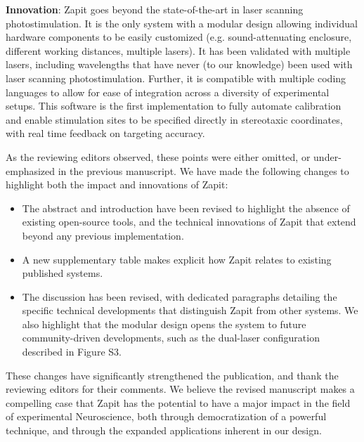 \documentclass[12pt]{letter}
\begin{document}
\textbf{Innovation}: Zapit goes beyond the state-of-the-art in laser scanning photostimulation. It is the only system with a modular design allowing individual hardware components to be easily customized (e.g. sound-attenuating enclosure, different working distances, multiple lasers). It has been validated with multiple lasers, including wavelengths that have never (to our knowledge) been used with laser scanning photostimulation. Further, it is compatible with multiple coding languages to allow for ease of integration across a diversity of experimental setups. This software is the first implementation to fully automate calibration and enable stimulation sites to be specified directly in stereotaxic coordinates, with real time feedback on targeting accuracy. 

As the reviewing editors observed, these points were either omitted, or under-emphasized in the previous manuscript. We have made the following changes to highlight both the impact and innovations of Zapit:

\begin{itemize}
    \item The abstract and introduction have been revised to highlight the absence of existing open-source tools, and the technical innovations of Zapit that extend beyond any previous implementation.
    \item     A new supplementary table makes explicit how Zapit relates to existing published systems.
    \item The discussion has been revised, with dedicated paragraphs detailing the specific technical developments that distinguish Zapit from other systems. We also highlight that the modular design opens the system to future community-driven developments, such as the dual-laser configuration described in Figure S3. 
\end{itemize}

These changes have significantly strengthened the publication, and thank the reviewing editors for their comments. We believe the revised manuscript makes a compelling case that Zapit has the potential to have a major impact in the field of experimental Neuroscience, both through democratization of a powerful technique, and through the expanded applications inherent in our design. 
\end{document}
